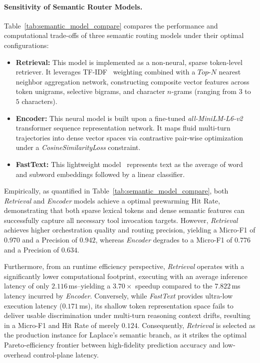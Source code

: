 \paragraph{Sensitivity of Semantic Router Models.}
Table~\ref{tab:semantic_model_compare} compares the performance and computational trade-offs of three semantic routing models under their optimal configurations:
\begin{itemize}[leftmargin=1.2em]
    \item \textbf{{Retrieval}:} This model is implemented as a non-neural, sparse token-level retriever. It leverages TF-IDF~\cite{sparck1972statistical} weighting combined with a $Top\text{-}N$ nearest neighbor aggregation network, constructing composite vector features across token unigrams, selective bigrams, and character $n$-grams (ranging from $3$ to $5$ characters).
    \item \textbf{{Encoder}:} This neural model is built upon a fine-tuned \textit{all-MiniLM-L6-v2}~\cite{encoder} transformer sequence representation network. It maps fluid multi-turn trajectories into dense vector spaces via contrastive pair-wise optimization under a \textit{CosineSimilarityLoss} constraint.
    \item \textbf{FastText:} This lightweight model~\cite{joulin2017bag} represents text as the average of word and subword embeddings followed by a linear classifier.
\end{itemize}

Empirically, as quantified in Table~\ref{tab:semantic_model_compare}, both \textit{Retrieval} and \textit{Encoder} models achieve a optimal prewarming Hit Rate, demonstrating that both sparse lexical tokens and dense semantic features can successfully capture all necessary tool invocation targets. However, \textit{Retrieval} achieves higher orchestration quality and routing precision, yielding a Micro-F1 of $0.970$ and a Precision of $0.942$, whereas \textit{Encoder} degrades to a Micro-F1 of $0.776$ and a Precision of $0.634$. 

Furthermore, from an runtime efficiency perspective, \textit{Retrieval} operates with a significantly lower computational footprint, executing with an average inference latency of only $2.116$\,ms--yielding a $3.70\times$ speedup compared to the $7.822$\,ms latency incurred by \textit{Encoder}. Conversely, while \textit{FastText} provides ultra-low execution latency ($0.171$\,ms), its shallow token representation space fails to deliver usable discrimination under multi-turn reasoning context drifts, resulting in a Micro-F1 and Hit Rate of merely $0.124$. Consequently, \textit{Retrieval} is selected as the production instance for Laplace's semantic branch, as it strikes the optimal Pareto-efficiency frontier 
between high-fidelity prediction accuracy and low-overhead control-plane latency.

